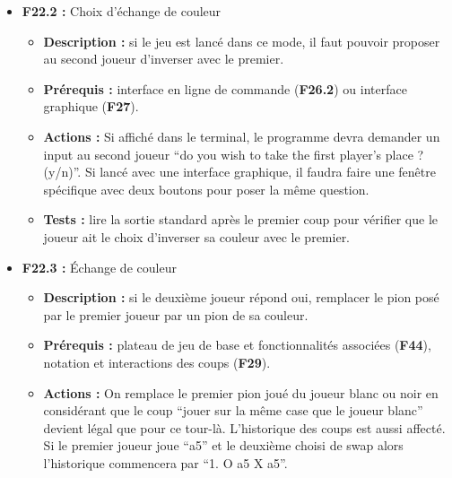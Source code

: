 \documentclass{article}
\begin{document}
\begin{itemize}
\begin{itemize}
\begin{itemize}
            \begin{itemize}
                \item \textbf{Description :} ajout d’une option en ligne de commande afin de spécifier que le jeu se lance avec cette option.
                \item \textbf{Prérequis :} vérification des options en ligne de commande (\textbf{F15.1}).
                \item \textbf{Actions :} À l’aide du module argparse (\textbf{F11}), on doit pouvoir reconnaître l’option “-s”/”--swap”.
                \item \textbf{Test :} vérifier que le programme soit bien dans ce mode si lancé avec cette option.
            \end{itemize}
            \smallskip
            \item \textbf{F22.2 :} Choix d’échange de couleur
            \begin{itemize}
                \item \textbf{Description :} si le jeu est lancé dans ce mode, il faut pouvoir proposer au second joueur d’inverser avec le premier.
                \item \textbf{Prérequis :} interface en ligne de commande (\textbf{F26.2}) ou interface graphique (\textbf{F27}).
                \item \textbf{Actions :} Si affiché dans le terminal, le programme devra demander un input au second joueur “do you wish to take the first player’s place ? (y/n)”. Si lancé avec une interface graphique, il faudra faire une fenêtre spécifique avec deux boutons pour poser la même question.
                \item \textbf{Tests :}  lire la sortie standard après le premier coup pour vérifier que le joueur ait le choix d’inverser sa couleur avec le premier.
            \end{itemize}
            \smallskip
            \item \textbf{F22.3 :} Échange de couleur
            \begin{itemize}
                \item \textbf{Description :} si le deuxième joueur répond oui, remplacer le pion posé par le premier joueur par un pion de sa couleur.
                \item \textbf{Prérequis :} plateau de jeu de base et fonctionnalités associées (\textbf{F44}), notation et interactions des coups (\textbf{F29}).
                \item \textbf{Actions :} On remplace le premier pion joué du joueur blanc ou noir en considérant que le coup “jouer sur la même case que le joueur blanc” devient légal que pour ce tour-là. L’historique des coups est aussi affecté. Si le premier joueur joue “a5” et le deuxième choisi de swap alors l’historique commencera par “1. O a5 X a5”.

\end{itemize}
\end{itemize}
\end{itemize}
\end{itemize}
\end{document}
